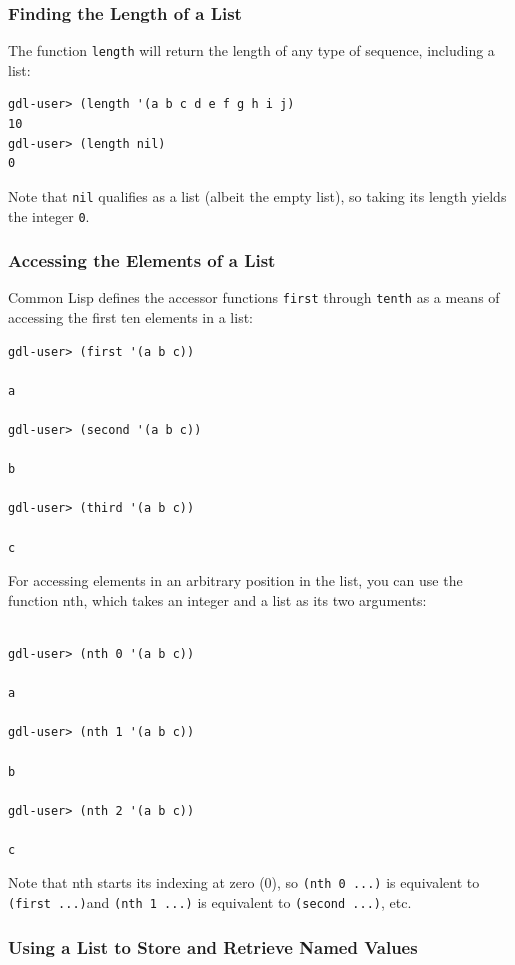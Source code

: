 \documentclass [11pt]{book}
\begin{document}
\subsubsection{Finding the Length of a List}

\label{subsubsec:findingthelengthofalist}

The function \texttt{length} will return the length of any type of sequence, including a list:

\begin{verbatim}gdl-user> (length '(a b c d e f g h i j)
10
gdl-user> (length nil)
0
\end{verbatim}Note that \texttt{nil} qualifies as a list (albeit the empty list), so taking its length yields the integer \texttt{0}.

\subsubsection{Accessing the Elements of a List}

\label{subsubsec:accessingtheelementsofalist}

Common Lisp defines the accessor functions \texttt{first} through \texttt{tenth} as a means of accessing the first ten elements in a list:

\begin{verbatim}
gdl-user> (first '(a b c))

a

gdl-user> (second '(a b c))

b

gdl-user> (third '(a b c))

c
\end{verbatim}For accessing elements in an arbitrary position in the list, you can use the function nth,
which takes an integer and a list as its two arguments:

\begin{verbatim}

gdl-user> (nth 0 '(a b c))

a

gdl-user> (nth 1 '(a b c))

b

gdl-user> (nth 2 '(a b c))

c
\end{verbatim}Note that nth starts its indexing at zero (0), so \texttt{(nth 0 ...)} is equivalent to \texttt{(first ...)}and \texttt{(nth 1 ...)} is equivalent to \texttt{(second ...)}, etc.

\subsubsection{Using a List to Store and Retrieve Named Values}
\end{document}
